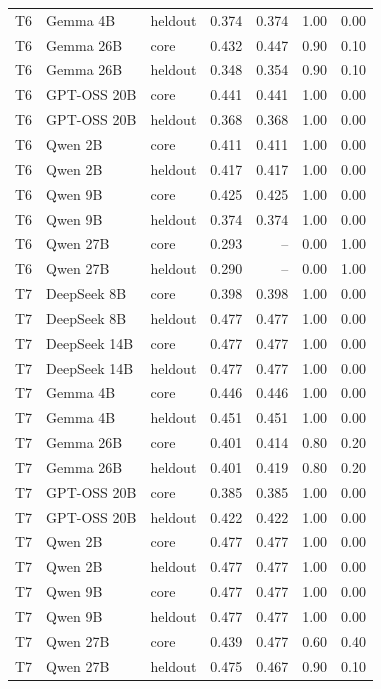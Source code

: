 \begin{longtable}{llllrrr}
    T6 & Gemma 4B & heldout & 0.374 & 0.374 & 1.00 & 0.00 \\
    T6 & Gemma 26B & core & 0.432 & 0.447 & 0.90 & 0.10 \\
    T6 & Gemma 26B & heldout & 0.348 & 0.354 & 0.90 & 0.10 \\
    T6 & GPT-OSS 20B & core & 0.441 & 0.441 & 1.00 & 0.00 \\
    T6 & GPT-OSS 20B & heldout & 0.368 & 0.368 & 1.00 & 0.00 \\
    T6 & Qwen 2B & core & 0.411 & 0.411 & 1.00 & 0.00 \\
    T6 & Qwen 2B & heldout & 0.417 & 0.417 & 1.00 & 0.00 \\
    T6 & Qwen 9B & core & 0.425 & 0.425 & 1.00 & 0.00 \\
    T6 & Qwen 9B & heldout & 0.374 & 0.374 & 1.00 & 0.00 \\
    T6 & Qwen 27B & core & 0.293 & -- & 0.00 & 1.00 \\
    T6 & Qwen 27B & heldout & 0.290 & -- & 0.00 & 1.00 \\
    T7 & DeepSeek 8B & core & 0.398 & 0.398 & 1.00 & 0.00 \\
    T7 & DeepSeek 8B & heldout & 0.477 & 0.477 & 1.00 & 0.00 \\
    T7 & DeepSeek 14B & core & 0.477 & 0.477 & 1.00 & 0.00 \\
    T7 & DeepSeek 14B & heldout & 0.477 & 0.477 & 1.00 & 0.00 \\
    T7 & Gemma 4B & core & 0.446 & 0.446 & 1.00 & 0.00 \\
    T7 & Gemma 4B & heldout & 0.451 & 0.451 & 1.00 & 0.00 \\
    T7 & Gemma 26B & core & 0.401 & 0.414 & 0.80 & 0.20 \\
    T7 & Gemma 26B & heldout & 0.401 & 0.419 & 0.80 & 0.20 \\
    T7 & GPT-OSS 20B & core & 0.385 & 0.385 & 1.00 & 0.00 \\
    T7 & GPT-OSS 20B & heldout & 0.422 & 0.422 & 1.00 & 0.00 \\
    T7 & Qwen 2B & core & 0.477 & 0.477 & 1.00 & 0.00 \\
    T7 & Qwen 2B & heldout & 0.477 & 0.477 & 1.00 & 0.00 \\
    T7 & Qwen 9B & core & 0.477 & 0.477 & 1.00 & 0.00 \\
    T7 & Qwen 9B & heldout & 0.477 & 0.477 & 1.00 & 0.00 \\
    T7 & Qwen 27B & core & 0.439 & 0.477 & 0.60 & 0.40 \\
    T7 & Qwen 27B & heldout & 0.475 & 0.467 & 0.90 & 0.10 \\
\bottomrule
\end{longtable}
